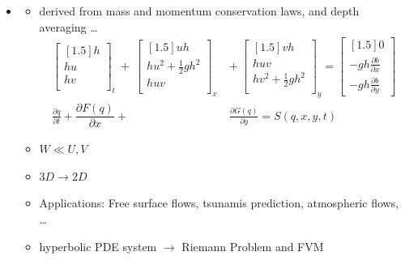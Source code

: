 \begin{frame}
    
\begin{multicols}{2}
\begin{itemize}

\item<2->[]
\begin{itemize}
\item derived from mass and momentum conservation laws, and depth averaging \dots %
\vspace{5pt}
\begin{align*}
\begin{bmatrix}[1.5]
h\\
hu\\
hv\\
\end{bmatrix}_t \ + \ 
\begin{bmatrix}[1.5]
uh\\
hu^2 + \frac{1}{2}gh^2\\
huv\\
\end{bmatrix}_x\ &+ \ 
\begin{bmatrix}[1.5]
vh\\
huv\\
hv^2 + \frac{1}{2}gh^2\\
\end{bmatrix}_y = 
\begin{bmatrix}[1.5]
0\\
-gh\frac{\partial b}{\partial x}\\
-gh\frac{\partial b}{\partial y}
\end{bmatrix}\\[1em]
\frac{\partial q}{\partial t} + \dfrac{\partial F(q)}{\partial x} + &\frac{\partial G(q)}{\partial y} = S(q,x,y,t) 
\end{align*}
\vspace{1em}
\item<3-> $ W \ll U,V $\\[0.5em]
\item<4-> $3D\rightarrow 2D$ \\[0.5em]
\item<5-> Applications: {\small Free surface flows, tsunamis prediction, atmospheric flows, \dots} \\[0.5em]
\item<6-> hyperbolic PDE system $\rightarrow$ Riemann Problem and FVM

\end{itemize}
\end{itemize}
\end{multicols}
\end{frame}
